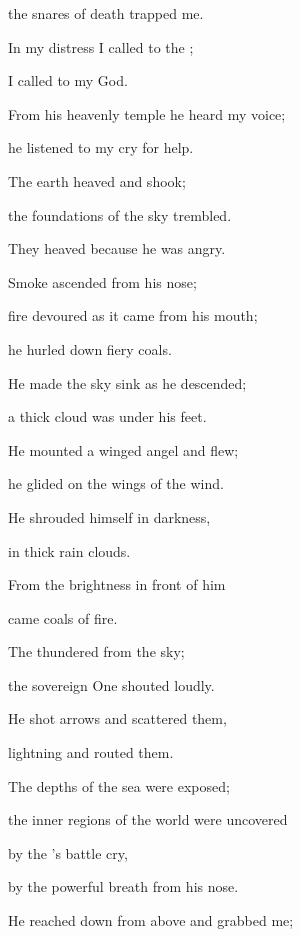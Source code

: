 {\par }{\Q the snares
of death trapped me.
\par }{\Q {}In my distress
I called
to the
{};
\par }{\Q I called
to
my God.
\par }{\Q From his heavenly temple
he heard
my voice;
\par }{\Q he listened to my cry for help.
\par }{\Q {}The earth
heaved
and shook;
\par }{\Q the foundations
of the sky
trembled.
\par }{\Q They heaved
because
he was angry.
\par }{\Q {}Smoke
ascended
from his nose;
\par }{\Q fire
devoured
as it came from
his mouth;
\par }{\Q he hurled down fiery coals.
\par }{\Q {}He made
the sky
sink
as he descended;
\par }{\Q a thick cloud
was under
his feet.
\par }{\Q {}He mounted
a winged
angel and flew;
\par }{\Q he glided
on
the wings
of the wind.
\par }{\Q {}He shrouded
himself in darkness,
\par }{\Q in thick
rain
clouds.
\par }{\Q {}From the brightness
in front
of him
\par }{\Q came coals
of fire.
\par }{\Q {}The
{}
thundered
from
the sky;
\par }{\Q the sovereign One
shouted
loudly.
\par }{\Q {}He shot
arrows
and scattered
them,

\par }{\Q lightning
and routed them.
\par }{\Q {}The depths
of the sea
were exposed;
\par }{\Q the inner regions
of the world
were uncovered
\par }{\Q by
the
{}’s
battle cry,

\par }{\Q by
the powerful breath
from his nose.
\par }{\Q {}He reached
down from above
and grabbed
me;

}
